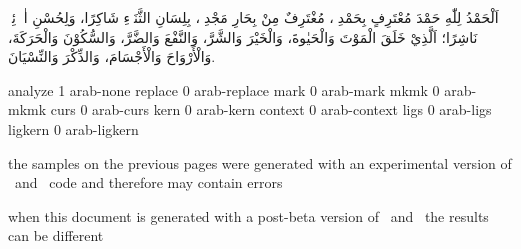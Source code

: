 
\startbuffer
اَلْحَمْدُ لِلّٰهِ حَمْدَ مُعْتَرِفٍ بِحَمْدِهٖ، مُغْتَرِفٌ مِنْ بِحَارِ مَجْدِهٖ، بِلِسَانِ
الثَّنَاۤءِ شَاكِرًا، وَلِحُسْنِ اٰلاۤئِهٖ نَاشِرًا؛ اَلَّذِيْ خَلَقَ الْمَوْتَ وَالْحَيٰوةَ، وَالْخَيْرَ
وَالشَّرَّ، وَالنَّفْعَ وَالضَّرَّ، وَالسُّكُوْنَ وَالْحَرَكَةَ، وَالْأَرْوَاحَ
وَالْأَجْسَامَ، وَالذِّكْرَ وَالنِّسْيَانَ.
\stopbuffer

\unexpanded{}

\ShowSample analyze 1 arab-none
\ShowSample replace 0 arab-replace
\ShowSample mark    0 arab-mark
\ShowSample mkmk    0 arab-mkmk
\ShowSample curs    0 arab-curs
\ShowSample kern    0 arab-kern
\ShowSample context 0 arab-context
\ShowSample ligs    0 arab-ligs
\ShowSample ligkern 0 arab-ligkern


\StartItem
    the samples on the previous pages were generated with an experimental version
    of \LUATEX\ and \MKIV\ code and therefore may contain errors
\StopItem

\StartItem
    when this document is generated with a post-beta version of \LUATEX\ and \CONTEXT\ the results
    can be different
\StopItem

\StopTopic

\stopdocument
